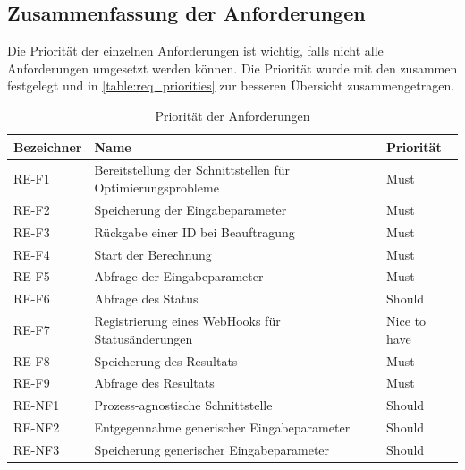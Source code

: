 \subsection{Zusammenfassung der Anforderungen}\label{toc_anfoderungen}
Die Priorität der einzelnen Anforderungen ist wichtig, falls nicht alle Anforderungen umgesetzt werden können. Die Priorität wurde mit den  zusammen festgelegt und in 
\autoref{table:req_priorities} zur besseren Übersicht zusammengetragen.
\begin{table}[ht]
\centering
  \begin{tabular}{ l | l | l }
	\hline
	\rowcolor{gray}
	\textbf{Bezeichner}	& \textbf{Name}	&	\textbf{Priorität}\\ \hline
	RE-F1 			&  Bereitstellung der Schnittstellen für Optimierungsprobleme	& Must\\ \hline
	RE-F2 			&  Speicherung der Eingabeparameter	& Must\\ \hline
	RE-F3 			&  Rückgabe einer ID bei Beauftragung	& Must\\ \hline
	RE-F4 			&  Start der Berechnung	& Must\\ \hline
	RE-F5 			&  Abfrage der Eingabeparameter	& Must\\ \hline
	RE-F6 			&  Abfrage des Status	& Should\\ \hline
	RE-F7 			&  Registrierung eines WebHooks für Statusänderungen	& Nice to have\\ \hline
	RE-F8 			&  Speicherung des Resultats	& Must\\ \hline
	RE-F9 			&  Abfrage des Resultats	& Must\\ \hline
	RE-NF1 			&  Prozess-agnostische Schnittstelle & Should\\ \hline
	RE-NF2 			&  Entgegennahme generischer Eingabeparameter & Should\\ \hline
	RE-NF3 			&  Speicherung generischer Eingabeparameter & Should\\ \hline
  \end{tabular}
   \caption{Priorität der Anforderungen}\label{table:req_priorities}
\end{table}